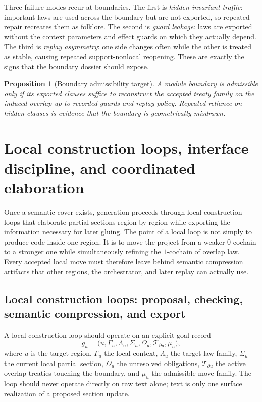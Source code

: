 \documentclass[11pt]{report}
\newtheorem{proposition}[definition]{Proposition}
\begin{document}
Three failure modes recur at boundaries. The first is \emph{hidden invariant traffic}: important laws are used across the boundary but are not exported, so repeated repair recreates them as folklore. The second is \emph{guard leakage}: laws are exported without the context parameters and effect guards on which they actually depend. The third is \emph{replay asymmetry}: one side changes often while the other is treated as stable, causing repeated support-nonlocal reopening. These are exactly the signs that the boundary dossier should expose.

\begin{proposition}[Boundary admissibility target]
A module boundary is admissible only if its exported clauses suffice to reconstruct the accepted treaty family on the induced overlap up to recorded guards and replay policy. Repeated reliance on hidden clauses is evidence that the boundary is geometrically misdrawn.
\end{proposition}

\chapter{Local construction loops, interface discipline, and coordinated elaboration}
Once a semantic cover exists, generation proceeds through local construction loops that elaborate partial sections region by region while exporting the information necessary for later gluing. The point of a local loop is not simply to produce code inside one region. It is to move the project from a weaker $0$-cochain to a stronger one while simultaneously refining the $1$-cochain of overlap law. Every accepted local move must therefore leave behind semantic compression artifacts that other regions, the orchestrator, and later replay can actually use.

\section{Local construction loops: proposal, checking, semantic compression, and export}
A local construction loop should operate on an explicit goal record
\[
g_u
=
\bigl(
u,
\Gamma_u,
\Lambda_u,
\Sigma_u,
\Omega_u,
\mathcal{T}_{\partial u},
\mu_u
\bigr),
\]
where $u$ is the target region, $\Gamma_u$ the local context, $\Lambda_u$ the target law family, $\Sigma_u$ the current local partial section, $\Omega_u$ the unresolved obligations, $\mathcal{T}_{\partial u}$ the active overlap treaties touching the boundary, and $\mu_u$ the admissible move family. The loop should never operate directly on raw text alone; text is only one surface realization of a proposed section update.
\end{document}
